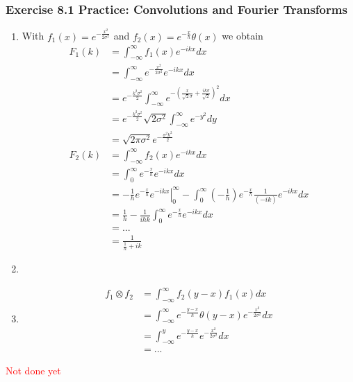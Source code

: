 \documentclass[10pt,a4paper]{book}
\theoremstyle{definition}
\begin{document}
\subsubsection{Exercise 8.1 Practice: Convolutions and Fourier Transforms}
\begin{enumerate}[label=(\alph*)]
\item With $f_1(x)=e^{-\frac{x^2}{2\sigma^2}}$ and $f_2(x)=e^{-\frac{x}{h}}\theta(x)$ we obtain
\begin{align}
    F_1(k)&=\int_{-\infty}^\infty f_1(x)e^{-ikx}dx\\
    &=\int_{-\infty}^\infty e^{-\frac{x^2}{2\sigma^2}}e^{-ikx}dx\\
    &=e^{-\frac{k^2\sigma^2}{2}}\int_{-\infty}^\infty e^{-\left(\frac{x}{\sqrt{2}\sigma}+\frac{ik\sigma}{\sqrt{2}}\right)^2}dx\\
    &=e^{-\frac{k^2\sigma^2}{2}} \sqrt{2\sigma^2} \int_{-\infty}^\infty e^{-y^2}dy\\
    &=\sqrt{2\pi\sigma^2}e^{-\frac{\sigma^2k^2}{2}}\\
    F_2(k)&=\int_{-\infty}^\infty f_2(x)e^{-ikx}dx\\
    &=\int_{0}^\infty e^{-\frac{x}{h}}e^{-ikx}dx\\
    &=-\frac{1}{h}\left.e^{-\frac{x}{h}}e^{-ikx}\right|_0^\infty -\int_{0}^\infty \left(-\frac{1}{h}\right)e^{-\frac{x}{h}}\frac{1}{(-ik)}e^{-ikx}dx\\
    &=\frac{1}{h} -\frac{1}{ihk}\int_{0}^\infty e^{-\frac{x}{h}}e^{-ikx}dx\\
    &= ...\\
    &=\frac{1}{\frac{1}{h}+ik}
\end{align}
\item
\item
\begin{align}
    f_1\otimes f_2
    &=\int_{-\infty}^\infty f_2(y-x)f_1(x)dx\\
    &=\int_{-\infty}^\infty e^{-\frac{y-x}{h}}\theta(y-x)e^{-\frac{x^2}{2\sigma^2}}dx\\
    &=\int_{-\infty}^y e^{-\frac{y-x}{h}}e^{-\frac{x^2}{2\sigma^2}}dx\\
    &=...
\end{align}
\end{enumerate}
\textcolor{red}{Not done yet}
\end{document}
